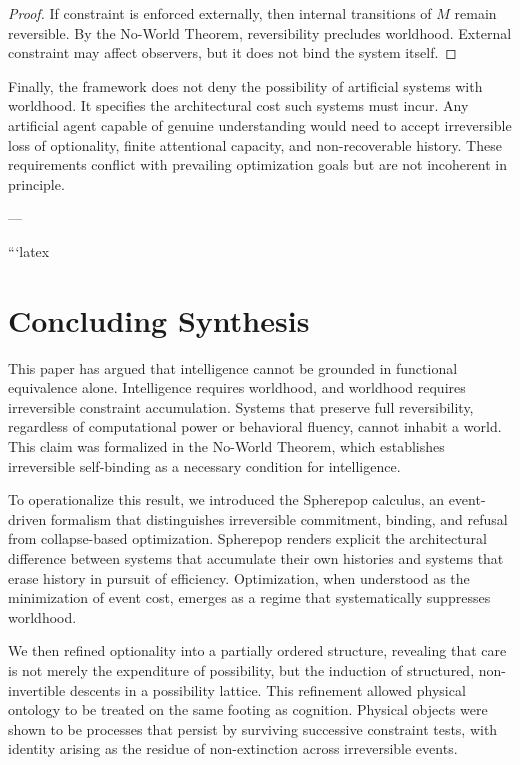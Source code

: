 \documentclass[11pt]{article}
\theoremstyle{remark}
\begin{document}
\begin{proof}
If constraint is enforced externally, then internal transitions of $M$ remain reversible. By the No-World Theorem, reversibility precludes worldhood. External constraint may affect observers, but it does not bind the system itself.
\end{proof}

Finally, the framework does not deny the possibility of artificial systems with worldhood. It specifies the architectural cost such systems must incur. Any artificial agent capable of genuine understanding would need to accept irreversible loss of optionality, finite attentional capacity, and non-recoverable history. These requirements conflict with prevailing optimization goals but are not incoherent in principle.

---

```latex
\section{Concluding Synthesis}

This paper has argued that intelligence cannot be grounded in functional equivalence alone. Intelligence requires worldhood, and worldhood requires irreversible constraint accumulation. Systems that preserve full reversibility, regardless of computational power or behavioral fluency, cannot inhabit a world. This claim was formalized in the No-World Theorem, which establishes irreversible self-binding as a necessary condition for intelligence.

To operationalize this result, we introduced the Spherepop calculus, an event-driven formalism that distinguishes irreversible commitment, binding, and refusal from collapse-based optimization. Spherepop renders explicit the architectural difference between systems that accumulate their own histories and systems that erase history in pursuit of efficiency. Optimization, when understood as the minimization of event cost, emerges as a regime that systematically suppresses worldhood.

We then refined optionality into a partially ordered structure, revealing that care is not merely the expenditure of possibility, but the induction of structured, non-invertible descents in a possibility lattice. This refinement allowed physical ontology to be treated on the same footing as cognition. Physical objects were shown to be processes that persist by surviving successive constraint tests, with identity arising as the residue of non-extinction across irreversible events.
\end{document}
